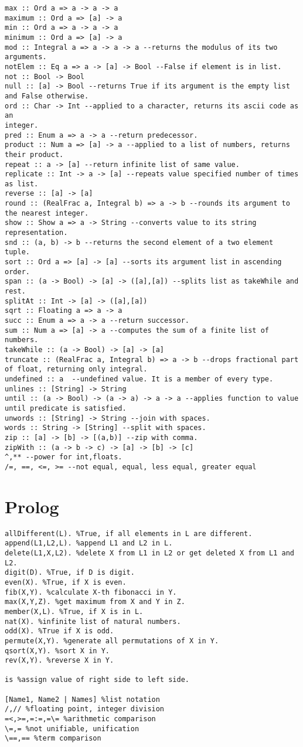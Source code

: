 \documentclass{article}
\begin{document}
\begin{verbatim}
max :: Ord a => a -> a -> a
maximum :: Ord a => [a] -> a
min :: Ord a => a -> a -> a
minimum :: Ord a => [a] -> a
mod :: Integral a => a -> a -> a --returns the modulus of its two arguments.
notElem :: Eq a => a -> [a] -> Bool --False if element is in list.
not :: Bool -> Bool
null :: [a] -> Bool --returns True if its argument is the empty list and False otherwise.
ord :: Char -> Int --applied to a character, returns its ascii code as an
integer.
pred :: Enum a => a -> a --return predecessor.
product :: Num a => [a] -> a --applied to a list of numbers, returns their product.
repeat :: a -> [a] --return infinite list of same value.
replicate :: Int -> a -> [a] --repeats value specified number of times as list.
reverse :: [a] -> [a]
round :: (RealFrac a, Integral b) => a -> b --rounds its argument to the nearest integer.
show :: Show a => a -> String --converts value to its string representation.
snd :: (a, b) -> b --returns the second element of a two element tuple.
sort :: Ord a => [a] -> [a] --sorts its argument list in ascending order.
span :: (a -> Bool) -> [a] -> ([a],[a]) --splits list as takeWhile and rest.
splitAt :: Int -> [a] -> ([a],[a]) 
sqrt :: Floating a => a -> a
succ :: Enum a => a -> a --return successor.
sum :: Num a => [a] -> a --computes the sum of a finite list of numbers.
takeWhile :: (a -> Bool) -> [a] -> [a]
truncate :: (RealFrac a, Integral b) => a -> b --drops fractional part of float, returning only integral.
undefined :: a  --undefined value. It is a member of every type.
unlines :: [String] -> String
until :: (a -> Bool) -> (a -> a) -> a -> a --applies function to value until predicate is satisfied.
unwords :: [String] -> String --join with spaces.
words :: String -> [String] --split with spaces.
zip :: [a] -> [b] -> [(a,b)] --zip with comma.
zipWith :: (a -> b -> c) -> [a] -> [b] -> [c]
^,** --power for int,floats.
/=, ==, <=, >= --not equal, equal, less equal, greater equal

\end{verbatim}


\section{Prolog}
\begin{verbatim}
allDifferent(L). %True, if all elements in L are different.
append(L1,L2,L). %append L1 and L2 in L.
delete(L1,X,L2). %delete X from L1 in L2 or get deleted X from L1 and L2.
digit(D). %True, if D is digit.
even(X). %True, if X is even.
fib(X,Y). %calculate X-th fibonacci in Y.
max(X,Y,Z). %get maximum from X and Y in Z.
member(X,L). %True, if X is in L.
nat(X). %infinite list of natural numbers.
odd(X). %True if X is odd.
permute(X,Y). %generate all permutations of X in Y.
qsort(X,Y). %sort X in Y.
rev(X,Y). %reverse X in Y.

is %assign value of right side to left side.

[Name1, Name2 | Names] %list notation
/,// %floating point, integer division
=<,>=,=:=,=\= %arithmetic comparison
\=,= %not unifiable, unification
\==,== %term comparison

\end{verbatim}
\end{document}
